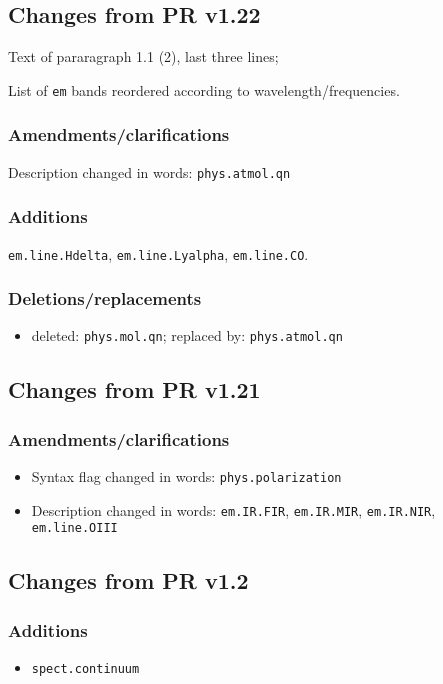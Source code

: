 \documentclass[11pt,a4paper]{ivoa}
\begin{document}
\subsection{Changes from PR v1.22}

Text of pararagraph 1.1 (2), last three lines;

List of {\tt em} bands reordered according to wavelength/frequencies.

\subsubsection*{Amendments/clarifications}
Description changed in words: {\tt phys.atmol.qn}

\subsubsection*{Additions}
{\tt em.line.Hdelta}, {\tt em.line.Lyalpha}, {\tt em.line.CO}.

\subsubsection*{Deletions/replacements}
\begin{itemize}
\item deleted: {\tt phys.mol.qn}; replaced by: {\tt phys.atmol.qn}
\end{itemize}

\subsection{Changes from PR v1.21}
\subsubsection*{Amendments/clarifications}
\begin{itemize}
\item Syntax flag changed in words: {\tt phys.polarization}
\item \begin{flushleft}
Description changed in words: 
{\tt em.IR.FIR}, {\tt em.IR.MIR}, {\tt em.IR.NIR}, {\tt em.line.OIII}
\end{flushleft}
\end{itemize}

\subsection{Changes from PR v1.2}
\subsubsection*{Additions}
\begin{itemize}
\item {\tt spect.continuum}
\end{itemize}
\end{document}
